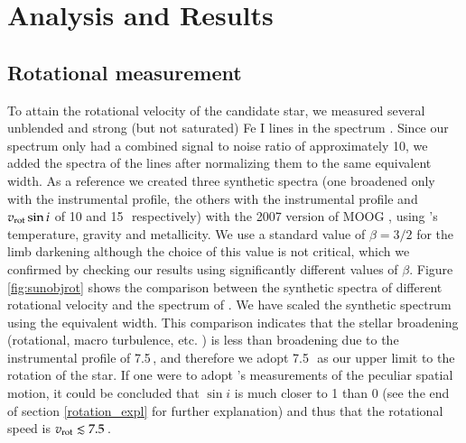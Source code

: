 \section{Analysis and Results}

\subsection{Rotational measurement}

To attain the rotational velocity of the candidate star, we measured
several unblended and strong (but not saturated) Fe I lines in the
spectrum \citep{1974lafl.book.....W}. Since our spectrum only had a
combined signal to noise ratio of approximately 10, we added the
spectra of the lines after normalizing them to the same equivalent
width. As a reference we created three synthetic spectra (one broadened only with the instrumental profile, the others with the instrumental profile and $v_{\rm{rot}}\sin{i}$ of 10 and 15\,\kms\ respectively) with the 2007 version of MOOG \citep{1973ApJ...184..839S}, using \gh's temperature, gravity and metallicity.  We use a standard value of $\beta=3/2$ for the limb darkening although the choice
of this value is not critical, which we confirmed by checking our
results using significantly different values of $\beta$. Figure
\ref{fig:sunobjrot} shows the comparison between the synthetic spectra of different rotational velocity and the spectrum of \starg. We have scaled the synthetic spectrum using the equivalent width. This comparison indicates that the stellar broadening (rotational, macro turbulence, etc. ) is less than broadening due to the instrumental profile of 7.5\,\kms, and therefore we adopt 7.5\,\kms\ as our upper limit to the rotation of the star. If one were to adopt \rl's measurements of the
peculiar spatial motion, it could be concluded that $\sin{i}$ is much closer
to 1 than 0 (see the end of section \ref{rotation_expl} for further
explanation) and thus that the rotational speed is $v_{\rm rot} \lesssim 7.5$\,\kms.

